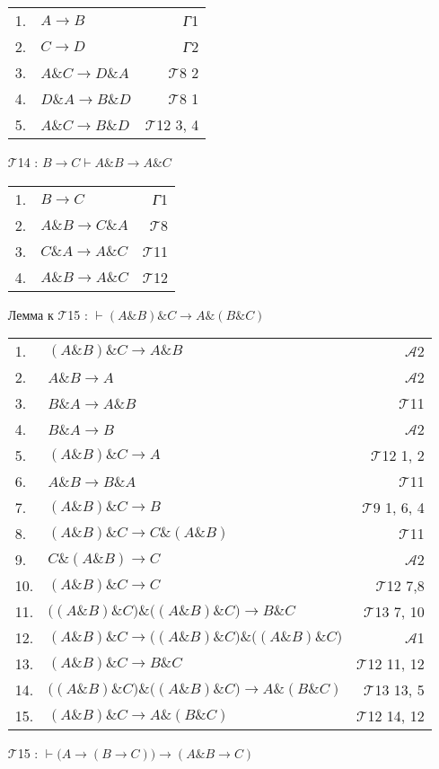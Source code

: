 \documentclass{article}
\begin{document}
\begin{itemize}
\begin{tabular}{llr}
1. & $A\rightarrow B$ & \textit{Г}1\\
2. & $C\rightarrow D$ & \textit{Г}2\\
3. & $A\& C\rightarrow D\& A$ & $\mathcal{T}$8 2\\
4. & $D\& A\rightarrow B\& D$ & $\mathcal{T}$8 1\\
5. & $A\& C\rightarrow B\& D$ & $\mathcal{T}$12 3, 4
\end{tabular}

\item[$\mathcal{T}$14]: $B\rightarrow C\vdash A\& B\rightarrow A\& C$

\begin{tabular}{llr}
1. & $B\rightarrow C$ & \textit{Г}1\\
2. & $A\& B\rightarrow C\& A$ & $\mathcal{T}$8\\
3. & $C\& A\rightarrow A\& C$ & $\mathcal{T}$11\\
4. & $A\& B\rightarrow A\& C$ & $\mathcal{T}$12
\end{tabular}

\item[Лемма к $\mathcal{T}$15]: $\vdash\left(A\& B\right)\& C\rightarrow A\&\left(B\& C\right)$

\begin{tabular}{llr}
1. & $\left(A\& B\right)\& C\rightarrow A\& B$ & $\mathcal{A}$2\\
2. & $A\& B\rightarrow A$ & $\mathcal{A}$2\\
3. & $B\& A\rightarrow A\& B$ & $\mathcal{T}$11\\
4. & $B\& A\rightarrow B$ & $\mathcal{A}$2\\
5. & $\left(A\& B\right)\& C\rightarrow A$ & $\mathcal{T}$12 1, 2\\
6. & $A\& B\rightarrow B\& A$ & $\mathcal{T}$11\\
7. & $\left(A\& B\right)\& C\rightarrow B$ & $\mathcal{T}$9 1, 6, 4\\
8. & $\left(A\& B\right)\& C\rightarrow C\&\left(A\&B\right)$ & $\mathcal{T}$11\\
9. & $C\&\left(A\&B\right)\rightarrow C$ & $\mathcal{A}$2\\
10. & $\left(A\&B\right)\&C\rightarrow C$ & $\mathcal{T}$12 7,8\\
11. & $\bigl(\left(A\&B\right)\&C\bigr)\&\bigl(\left(A\&B\right)\&C\bigr)\rightarrow B\&C$ & $\mathcal{T}$13 7, 10\\
12. & $\left(A\&B\right)\&C\rightarrow\bigl(\left(A\&B\right)\&C\bigr)\&\bigl(\left(A\&B\right)\&C\bigr)$ & $\mathcal{A}$1\\
13. & $\left(A\&B\right)\&C\rightarrow B\&C$ & $\mathcal{T}$12 11, 12\\
14. & $\bigl(\left(A\&B\right)\&C\bigr)\&\bigl(\left(A\&B\right)\&C\bigr)\rightarrow A\&\left(B\&C\right)$ & $\mathcal{T}$13 13, 5\\
15. & $\left(A\&B\right)\&C\rightarrow A\&\left(B\&C\right)$ & $\mathcal{T}$12 14, 12
\end{tabular}
\item[$\mathcal{T}$15]: $\vdash\bigl(A\rightarrow\left(B\rightarrow C\right)\bigr)\rightarrow\left(A\& B\rightarrow C\right)$


\end{itemize}
\end{document}
